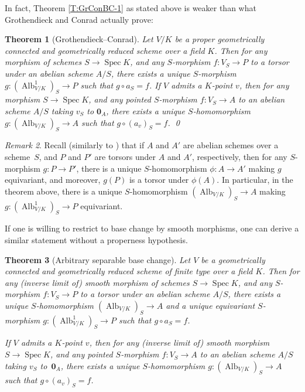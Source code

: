 \documentclass[11pt, reqno]{amsart}
\numberwithin{equation}{section}
\newtheorem{teo}{Theorem}[section]
\theoremstyle{definition}
\theoremstyle{remark}
\newtheorem{rem}[teo]{Remark}
\DeclareMathOperator{\alb}{Alb}
\DeclareMathOperator{\spec}{Spec}
\begin{document}
In fact, Theorem \ref{T:GrConBC-1} as stated above is weaker than what
Grothendieck \cite[Thm.~VI.3.3(iii)]{FGA} and Conrad
\cite[Thm.]{ConradMathOver} actually prove:

 \begin{teo}[Grothendieck--Conrad]
  \label{T:groconrad}
  Let $V/K$ be a \emph{proper} geometrically connected and geometrically reduced  scheme
  over a field $K$.  
  Then for any morphism  of schemes $S
  \to \spec K$, and any $S$-morphism  $f: V_S \to P$ to a torsor under an abelian
  scheme $A/S$, there exists a unique $S$-morphism  $g: (\alb^1_{V/K})_S \to
  P$ such that $g\circ a_S = f$.
  If $V$ admits a $K$-point $v$, then  for any  morphism $S
  \to \spec K$, and any pointed $S$-morphism  $f: V_S \to A$ to an abelian
  scheme $A/S$ taking $v_S$ to $\mathbf 0_A$, there exists a unique $S$-homomorphism $g: (\alb_{V/K})_S\to A$ such that $g\circ (a_v)_S = f$.
   \qed
 \end{teo}


 \begin{rem}
 Recall (similarly to ) that if $A$ and $A'$ are abelian schemes over a scheme~$S$, and $P$ and $P'$ are torsors under $A$ and $A'$, respectively, then for any $S$-morphism $g:P\to P'$, there is a unique $S$-homomorphism $\phi:A\to A'$ making $g$ equivariant, and moreover, $g(P)$ is a torsor under $\phi(A)$.  In particular, in the theorem above, 
there is a unique  $S$-homomorphism $(\operatorname{Alb}_{V/K})_S\to A$ making $g:(\operatorname{Alb}^1_{V/K})_S\to P$ equivariant.  
\end{rem}

If one is willing to restrict to base change by smooth morphisms, one
can derive a similar statement without a properness
hypothesis.

 \begin{teo}[Arbitrary separable base change]
  \label{T:groconrad-open}
  Let $V$ be a
  geometrically connected and geometrically reduced 
  scheme of finite type over a field $K$.
      Then for any (inverse limit of) smooth morphism of schemes $S
  \to \spec K$, and any $S$-morphism  $f: V_S \to P$ to a torsor under an abelian
  scheme $A/S$, there exists a unique $S$-homomorphism $(\alb_{V/K})_S\to A$ and a unique equivariant $S$-morphism  $g: (\alb^1_{V/K})_S \to P$ such that $g\circ a_S = f$.
  
  If $V$ admits a $K$-point $v$, then  for any  (inverse limit of) smooth  morphism $S
  \to \spec K$, and any pointed $S$-morphism  $f: V_S \to A$ to an abelian
  scheme $A/S$ taking $v_S$ to~$\mathbf 0_A$, there exists a unique $S$-homomorphism $g: (\alb_{V/K})_S\to A$ such that $g\circ (a_v)_S = f$.
 \end{teo}
 
\end{document}
